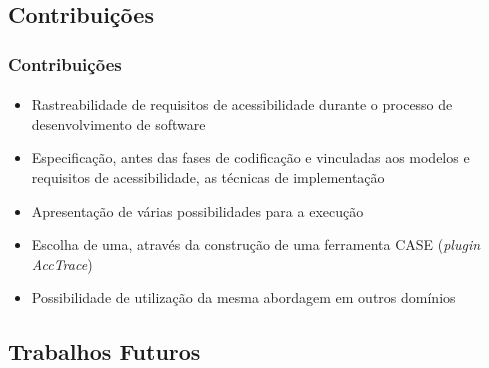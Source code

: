 \documentclass{beamer}
\begin{document}
\subsection[Contribuições]{Contribuições}

\begin{frame}
\frametitle{Contribuições}
\framesubtitle{}

\begin{itemize}
  \item Rastreabilidade de requisitos de acessibilidade durante o processo de desenvolvimento de software
  \item Especificação, antes das fases de codificação e vinculadas aos modelos e requisitos de acessibilidade, as técnicas de implementação
  \item Apresentação de várias possibilidades para a execução
  \item Escolha de uma, através da construção de uma ferramenta CASE (\textit{plugin AccTrace})
  \item Possibilidade de utilização da mesma abordagem em outros domínios
\end{itemize}

\end{frame}

\subsection[Trabalhos Futuros]{Trabalhos Futuros}
\end{document}
